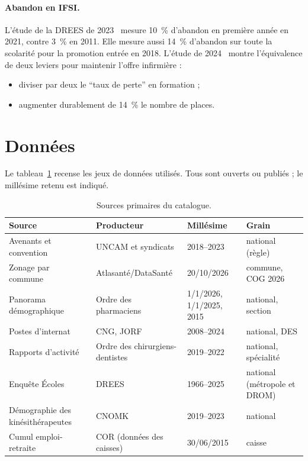 \paragraph{Abandon en IFSI.}
L'étude de la DREES de 2023~\cite{a1-er1266} mesure 10~\% d'abandon en
première année en 2021, contre 3~\% en 2011. Elle mesure aussi 14~\%
d'abandon sur toute la scolarité pour la promotion entrée en 2018.
L'étude de 2024~\cite{a1-er1319} montre l'équivalence de deux leviers pour
maintenir l'offre infirmière :
\begin{itemize}
\item diviser par deux le \enquote{taux de perte} en formation ;
\item augmenter durablement de 14~\% le nombre de places.
\end{itemize}

\section{Données}

Le tableau~\ref{a1-tab:donnees} recense les jeux de données utilisés. Tous
sont ouverts ou publiés ; le millésime retenu est indiqué.

\begin{table}[htbp]
\centering\small
\caption{Sources primaires du catalogue.}\label{a1-tab:donnees}
\begin{tabular}{p{4.2cm}p{3.2cm}p{3cm}p{3.6cm}}
\toprule
Source & Producteur & Millésime & Grain \\
\midrule
Avenants et convention~\cite{a1-avenant6ide,a1-avenant4sf,a1-avenant7mk,a1-conventioncd2023} & UNCAM et syndicats & 2018--2023 & national (règle) \\
Zonage par commune~\cite{a1-zonagesdatagouv} & Atlasanté/DataSanté & 20/10/2026 & commune, COG 2026 \\
Panorama démographique~\cite{a1-cnop2025,a1-cnop2024,a1-cnop2016} & Ordre des pharmaciens & 1/1/2026, 1/1/2025, 2015 & national, section \\
Postes d'internat~\cite{a1-cng2018,a1-arrete2023odonto,a1-arrete2024odonto} & CNG, JORF & 2008--2024 & national, DES \\
Rapports d'activité~\cite{a1-oncd2022} & Ordre des chirurgiens-dentistes & 2019--2022 & national, spécialité \\
Enquête Écoles~\cite{a1-drees491} & DREES & 1966--2025 & national (métropole et DROM) \\
Démographie des kinésithérapeutes~\cite{a1-cnomk2024} & CNOMK & 2019--2023 & national \\
Cumul emploi-retraite~\cite{a1-cor2016} & COR (données des caisses) & 30/06/2015 & caisse \\
\bottomrule
\end{tabular}
\end{table}

